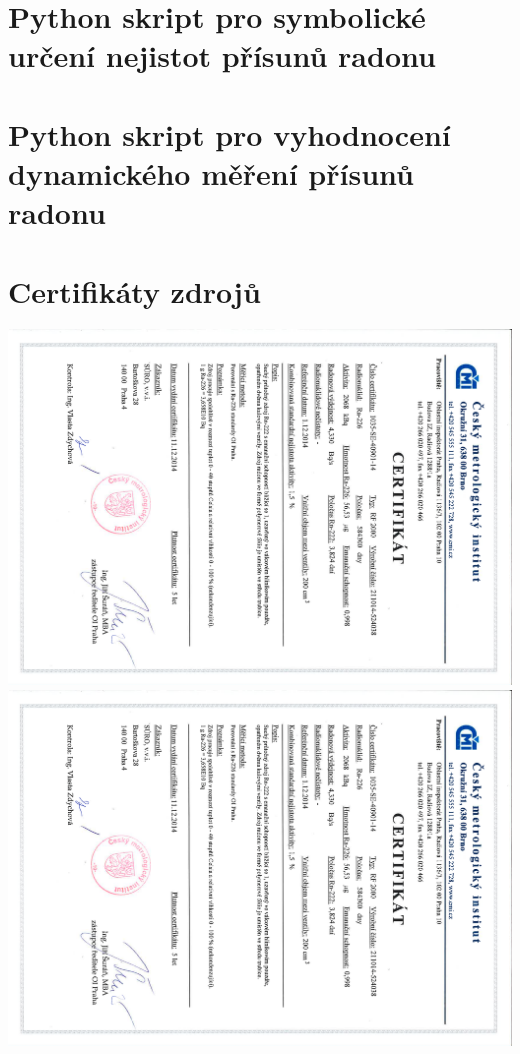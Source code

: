 \appendix
\chapter{Python skript pro symbolické určení nejistot přísunů radonu}\label{navesti:priloha_nejistoty}


\chapter{Python skript pro vyhodnocení dynamického měření přísunů radonu}\label{navesti:priloha_dynamickeMereni}


\chapter{Certifikáty zdrojů}\label{navesti:priloha_zdroje}
\centering
\includegraphics[page=1, angle=90, scale=0.7]{zdroje.pdf}
\newpage
\includegraphics[page=2, angle=90, scale=0.7]{zdroje.pdf}
%

